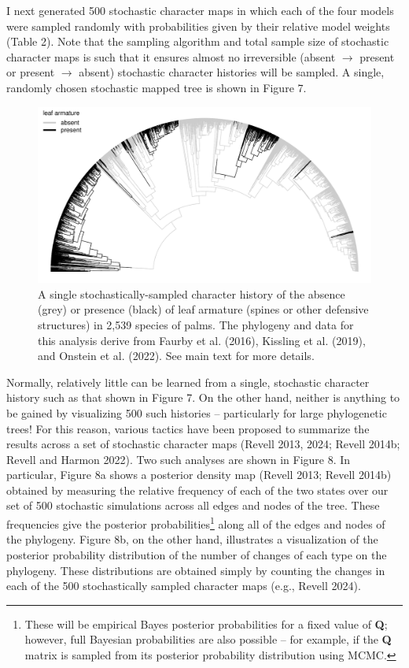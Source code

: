 \documentclass{article}
\begin{document}
I next generated 500 stochastic character maps in which each of the four models were sampled randomly with probabilities given by their relative model weights (Table 2). Note that the sampling algorithm and total sample size of stochastic character maps is such that it ensures almost no irreversible (absent \(\rightarrow\) present or present \(\rightarrow\) absent) stochastic character histories will be sampled. A single, randomly chosen stochastic mapped tree is shown in Figure 7.

\begin{figure}
\includegraphics[width=1\linewidth]{Revell.AncestralReconstruction_files/figure-latex/fig7-1} \caption{A single stochastically-sampled character history of the absence (grey) or presence (black) of leaf armature (spines or other defensive structures) in 2,539 species of palms. The phylogeny and data for this analysis derive from Faurby et al. (2016), Kissling et al. (2019), and Onstein et al. (2022). See main text for more details.}\label{fig:fig7}
\end{figure}

Normally, relatively little can be learned from a single, stochastic character history such as that shown in Figure 7. On the other hand, neither is anything to be gained by visualizing 500 such histories -- particularly for large phylogenetic trees! For this reason, various tactics have been proposed to summarize the results across a set of stochastic character maps (Revell 2013, 2024; Revell 2014b; Revell and Harmon 2022). Two such analyses are shown in Figure 8. In particular, Figure 8a shows a posterior density map (Revell 2013; Revell 2014b) obtained by measuring the relative frequency of each of the two states over our set of 500 stochastic simulations across all edges and nodes of the tree. These frequencies give the posterior probabilities\footnote{These will be empirical Bayes posterior probabilities for a fixed value of \textbf{Q}; however, full Bayesian probabilities are also possible -- for example, if the \textbf{Q} matrix is sampled from its posterior probability distribution using MCMC.} along all of the edges and nodes of the phylogeny. Figure 8b, on the other hand, illustrates a visualization of the posterior probability distribution of the number of changes of each type on the phylogeny. These distributions are obtained simply by counting the changes in each of the 500 stochastically sampled character maps (e.g., Revell 2024).
\end{document}
